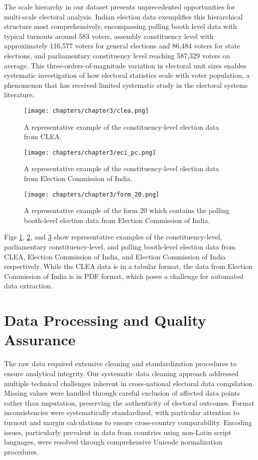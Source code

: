 The scale hierarchy in our dataset presents unprecedented opportunities for multi-scale electoral analysis. Indian election data exemplifies this hierarchical structure most comprehensively, encompassing polling booth level data with typical turnouts around 583 voters, assembly constituency level with approximately 116,577 voters for general elections and 86,484 voters for state elections, and parliamentary constituency level reaching 587,329 voters on average. This three-orders-of-magnitude variation in electoral unit sizes enables systematic investigation of how electoral statistics scale with voter population, a phenomenon that has received limited systematic study in the electoral systems literature.
\begin{figure}[H]
    \centering
    \texttt{[image: chapters/chapter3/clea.png]}
    \caption{A representative example of the constituency-level election data from CLEA.}
    \label{fig:clea}
\end{figure}

\begin{figure}[H]
    \centering
    \texttt{[image: chapters/chapter3/eci\_pc.png]}
    \caption{A representative example of the constituency-level election data from Election Commission of India.}
    \label{fig:eci_pc}
\end{figure}

\begin{figure}[H]
    \centering
    \texttt{[image: chapters/chapter3/form\_20.png]}
    \caption{A representative example of the form 20 which contains the polling booth-level election data from Election Commission of India.}
    \label{fig:form_20}
\end{figure}
Figs \ref{fig:clea}, \ref{fig:eci_pc}, and \ref{fig:form_20} show representative examples of the constituency-level, parliamentary constituency-level, and polling booth-level election data from CLEA, Election Commission of India, and Election Commission of India respectively. While the CLEA data is in a tabular format, the data from Election Commission of India is in PDF format, which poses a challenge for automated data extraction.
\section{Data Processing and Quality Assurance}
The raw data required extensive cleaning and standardization procedures to ensure analytical integrity. Our systematic data cleaning approach addressed multiple technical challenges inherent in cross-national electoral data compilation. Missing values were handled through careful exclusion of affected data points rather than imputation, preserving the authenticity of electoral outcomes. Format inconsistencies were systematically standardized, with particular attention to turnout and margin calculations to ensure cross-country comparability. Encoding issues, particularly prevalent in data from countries using non-Latin script languages, were resolved through comprehensive Unicode normalization procedures.

